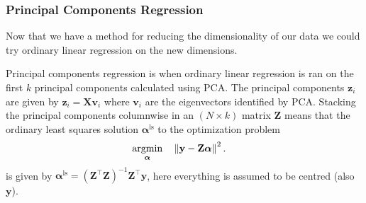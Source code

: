 \documentclass[a4paper, 12pt]{scrartcl}
\newcommand{\bfalpha}{\boldsymbol{\alpha}}
\begin{document}
\subsubsection*{Principal Components Regression}
Now that we have a method for reducing the dimensionality of our data we could try ordinary linear regression on the new dimensions.
\begin{algorithm}
	Principal components regression is when ordinary linear regression is ran on the first $k$ principal components calculated using PCA.
	The principal components $\mathbf{z}_i$ are given by $\mathbf{z}_i=\mathbf{X}\mathbf{v}_i$ where $\mathbf{v}_i$ are the eigenvectors identified by PCA.
	Stacking the principal components columnwise in an $\left(N\times k\right)$ matrix $\mathbf{Z}$ means that the ordinary least squares solution $\bfalpha^\mathrm{ls}$ to the optimization problem
	\begin{equation*}
	\begin{aligned}
	\operatornamewithlimits{argmin}_{\bfalpha} & & &\left\|\mathbf{y}-\mathbf{Z}\bfalpha\right\|^2.
	\end{aligned}
	\end{equation*}
	is given by $\bfalpha^\mathrm{ls}=\left(\mathbf{Z}^\intercal\mathbf{Z}\right)^{-1}\mathbf{Z}^\intercal\mathbf{y}$, here everything is assumed to be centred (also $\mathbf{y}$).
	
\end{algorithm}
\end{document}
